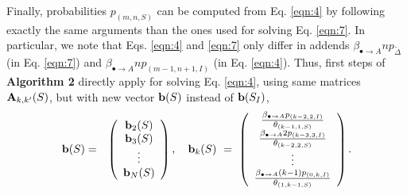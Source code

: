 \documentclass[preprint,12pt]{elsarticle}
\begin{document}
\par Finally, probabilities $p_{(m,n,S)}$ can be computed from Eq. \eqref{eqn:4} by following exactly the same arguments than the ones used for solving Eq. \eqref{eqn:7}. In
particular, we note that Eqs. \eqref{eqn:4} and \eqref{eqn:7} only differ in addends $\beta_{\bullet\rightarrow A}np_{{\tilde \Delta}}$ (in Eq. \eqref{eqn:7})
and $\beta_{\bullet\rightarrow A}np_{(m-1,n+1,I)}$ (in Eq. \eqref{eqn:4}). Thus, first steps of {\bf Algorithm 2} directly apply for solving
Eq. \eqref{eqn:4}, using same matrices ${\bf A}_{k,k'}(S)$, but with new vector ${\bf b}(S)$ instead of ${\bf b}(S_I)$,
\begin{eqnarray*}
{\bf b}(S) &=& \left(\begin{array}{c}
                          {\bf b}_2(S)\\
{\bf b}_3(S)\\
\vdots\\
{\bf b}_N(S)
                         \end{array}\right),\quad
{\bf b}_k(S) \ = \ \left(\begin{array}{c}
               \frac{\beta_{\bullet\rightarrow A}p_{(k-2,2,I)}}{\theta_{(k-1,1,S)}}\\
\frac{\beta_{\bullet\rightarrow A}2p_{(k-3,3,I)}}{\theta_{(k-2,2,S)}}\\
\vdots\\
\frac{\beta_{\bullet\rightarrow A}(k-1)p_{(0,k,I)}}{\theta_{(1,k-1,S)}}\\
                         \end{array}\right).
\end{eqnarray*}

\end{document}
